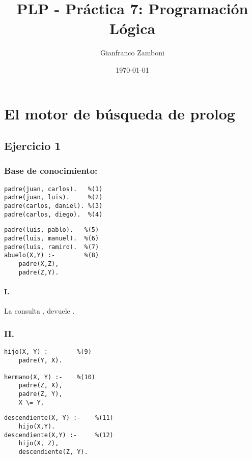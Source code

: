 \documentclass[10pt,a4paper]{article}
\begin{document}
  \title{PLP - Práctica 7: Programación Lógica}

  \date{\today}

  \author{Gianfranco Zamboni}

  \maketitle
  \setcounter{page}{1}


\section*{El motor de búsqueda de prolog}

\subsection{Ejercicio 1}
\subsubsection*{Base de conocimiento:}

\begin{multicols}{2}
\begin{centrado2}
\begin{verbatim}
padre(juan, carlos).   %(1)
padre(juan, luis).     %(2)
padre(carlos, daniel). %(3) 
padre(carlos, diego).  %(4)
\end{verbatim}
\end{centrado2}
\begin{centrado2}
\begin{verbatim}
padre(luis, pablo).   %(5)
padre(luis, manuel).  %(6)
padre(luis, ramiro).  %(7)
abuelo(X,Y) :-        %(8)
    padre(X,Z), 
    padre(Z,Y).
\end{verbatim}
\end{centrado2}
\end{multicols}

\paragraph{I.} La consulta , devuele .

\subsubsection*{II.}
\begin{multicols}{2}
\begin{centrado2}
\begin{verbatim}
hijo(X, Y) :-       %(9)
	padre(Y, X).

hermano(X, Y) :-    %(10)
	padre(Z, X), 
	padre(Z, Y),
	X \= Y.
\end{verbatim}
\end{centrado2}
\vfill\null
\columnbreak
\begin{centrado2}
\begin{verbatim}
descendiente(X, Y) :-    %(11)
	hijo(X,Y).
descendiente(X,Y) :-     %(12)
	hijo(X, Z),
	descendiente(Z, Y).
\end{verbatim}
\end{centrado2}
\end{multicols}
\end{document}
